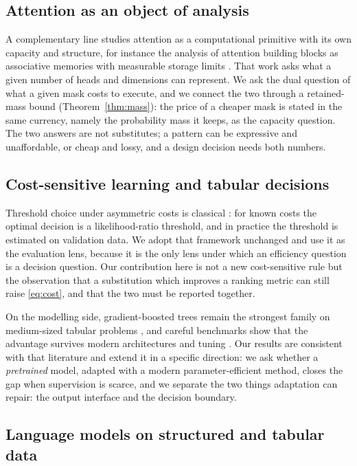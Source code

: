 \subsection{Attention as an object of analysis}

A complementary line studies attention as a computational primitive with its own
capacity and structure, for instance the analysis of attention building blocks
as associative memories with measurable storage limits
\cite{baldi2023quarks}. That work asks what a given number of heads and
dimensions can represent. We ask the dual question of what a given mask costs to
execute, and we connect the two through a retained-mass bound
(Theorem~\ref{thm:mass}): the price of a cheaper mask is stated in the same
currency, namely the probability mass it keeps, as the capacity question. The two
answers are not substitutes; a pattern can be expressive and unaffordable, or
cheap and lossy, and a design decision needs both numbers.

\subsection{Cost-sensitive learning and tabular decisions}

Threshold choice under asymmetric costs is classical
\cite{elkan2001foundations}: for known costs the optimal decision is a
likelihood-ratio threshold, and in practice the threshold is estimated on
validation data. We adopt that framework unchanged and use it as the evaluation
lens, because it is the only lens under which an efficiency question is a
decision question. Our contribution here is not a new cost-sensitive rule but
the observation that a substitution which improves a ranking metric can still
raise \eqref{eq:cost}, and that the two must be reported together.

On the modelling side, gradient-boosted trees remain the strongest family on
medium-sized tabular problems \cite{chen2016xgboost,ke2017lightgbm}, and careful
benchmarks show that the advantage survives modern architectures and tuning
\cite{gorishniy2021revisiting,grinsztajn2022why}. Our results are consistent
with that literature and extend it in a specific direction: we ask whether a
\emph{pretrained} model, adapted with a modern parameter-efficient method, closes
the gap when supervision is scarce, and we separate the two things adaptation can
repair: the output interface and the decision boundary.

\subsection{Language models on structured and tabular data}


